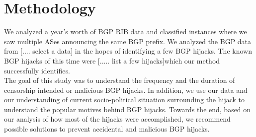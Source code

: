  \section{Methodology}\label{sec:methodology}
We analyzed a year's worth of BGP RIB data and classified instances where we saw multiple ASes announcing the same BGP prefix. We analyzed the BGP data from [.... select a data] in the hopes of identifying a few BGP hijacks. The known BGP hijacks  of this time were [..... list a few hijacks]which our method successfully  identifies. \\
The goal of this study was to understand the frequency and the duration of censorship intended or malicious BGP hijacks. In addition, we  use our data and our understanding of current socio-political situation surrounding the hijack to understand the popular motives behind BGP hijacks. Towards the end, based on our analysis of how most of the hijacks were accomplished, we recommend possible solutions to prevent accidental and malicious BGP hijacks. 
